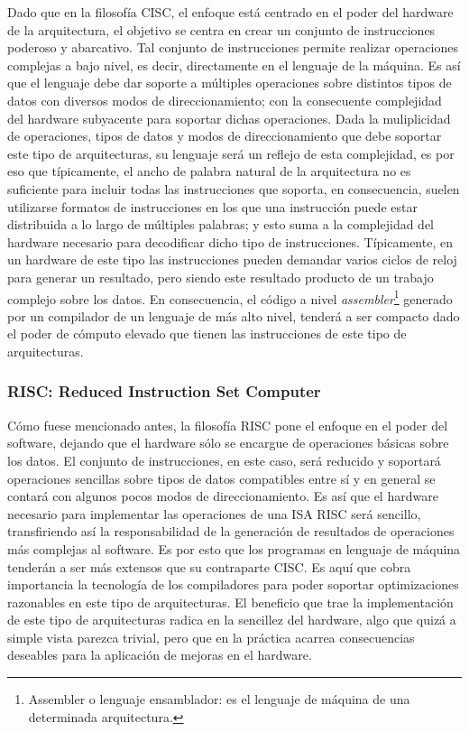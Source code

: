 Dado que en la filosofía CISC, el enfoque está centrado en el poder del 
hardware de la arquitectura, el objetivo se centra en crear un conjunto de 
instrucciones poderoso y abarcativo. Tal conjunto de instrucciones permite 
realizar operaciones complejas a bajo nivel, es decir, directamente en el 
lenguaje de la máquina. Es así que el lenguaje debe dar soporte a múltiples 
operaciones sobre distintos tipos de datos con diversos modos de 
direccionamiento; con la consecuente complejidad del hardware subyacente para 
soportar dichas operaciones. Dada la muliplicidad de operaciones, tipos de 
datos y modos de direccionamiento que debe soportar este tipo de arquitecturas, 
su lenguaje será un reflejo de esta complejidad, es por eso que típicamente, el 
ancho de palabra natural de la arquitectura no es suficiente para incluir todas 
las instrucciones que soporta, en consecuencia, suelen utilizarse formatos de 
instrucciones en los que una instrucción puede estar distribuida a lo largo de 
múltiples palabras; y esto suma a la complejidad del hardware necesario para 
decodificar dicho tipo de instrucciones. Típicamente, en un hardware de este 
tipo las instrucciones pueden demandar varios ciclos de reloj para generar un 
resultado, pero siendo este resultado producto de un trabajo complejo sobre 
los datos. En consecuencia, el código a nivel 
\emph{assembler}\footnote{Assembler o lenguaje ensamblador: es el lenguaje de 
máquina de una determinada arquitectura.} generado por un compilador de un 
lenguaje de más alto nivel, tenderá a ser compacto dado el poder de cómputo 
elevado que tienen las instrucciones de este tipo de arquitecturas. 

\subsubsection{RISC: Reduced Instruction Set Computer}
\label{subsubsec:theory-modern-isa_class-risc}

Cómo fuese mencionado antes, la filosofía RISC pone el enfoque en el poder del 
software, dejando que el hardware sólo se encargue de operaciones básicas sobre 
los datos. El conjunto de instrucciones, en este caso, será reducido y 
soportará operaciones sencillas sobre tipos de datos compatibles entre sí y en 
general se contará con algunos pocos modos de direccionamiento. Es así que el 
hardware necesario para implementar las operaciones de una ISA RISC será 
sencillo, transfiriendo así la responsabilidad de la generación de resultados 
de operaciones más complejas al software. Es por esto que los programas en 
lenguaje de máquina tenderán a ser más extensos que su contraparte CISC. Es 
aquí que cobra importancia la tecnología de los compiladores para poder 
soportar optimizaciones razonables en este tipo de arquitecturas. El beneficio 
que trae la implementación de este tipo de arquitecturas radica en la sencillez 
del hardware, algo que quizá a simple vista parezca trivial, pero que en la 
práctica acarrea consecuencias deseables para la aplicación de mejoras en el 
hardware.\\

